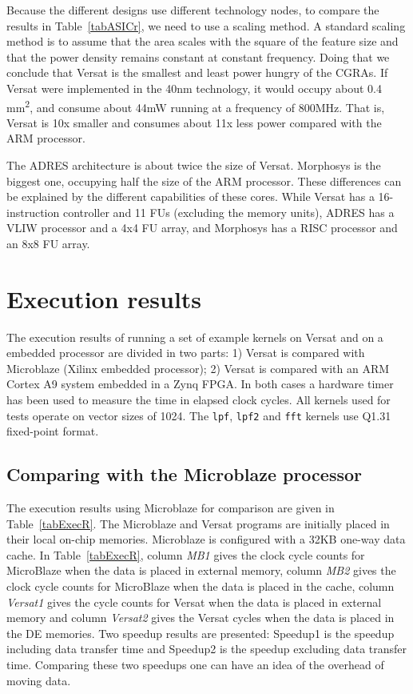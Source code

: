 Because the different designs use different technology nodes, to
compare the results in Table~\ref{tabASICr}, we need to use a scaling
method. A standard scaling method is to assume that the area scales
with the square of the feature size and that the power density remains
constant at constant frequency. Doing that we conclude that Versat is
the smallest and least power hungry of the CGRAs. If Versat were
implemented in the 40nm technology, it would occupy about 0.4
mm\textsuperscript{2}, and consume about 44mW running at a frequency
of 800MHz. That is, Versat is 10x smaller and consumes about 11x less
power compared with the ARM processor.

The ADRES architecture is about twice the size of Versat. Morphosys is
the biggest one, occupying half the size of the ARM processor. These
differences can be explained by the different capabilities of these
cores. While Versat has a 16-instruction controller and 11 FUs
(excluding the memory units), ADRES has a VLIW processor and a 4x4 FU
array, and Morphosys has a RISC processor and an 8x8 FU array.


\section{Execution results}
\label{subsection:executionResults}

The execution results of running a set of example kernels on Versat
and on a embedded processor are divided in two parts: 1) Versat is
compared with Microblaze (Xilinx embedded processor); 2) Versat is
compared with an ARM Cortex A9 system embedded in a Zynq FPGA. In both
cases a hardware timer has been used to measure the time in elapsed
clock cycles. All kernels used for tests operate on vector sizes of 1024.
The {\tt lpf}, {\tt lpf2} and {\tt fft} kernels use Q1.31 fixed-point format.

\subsection{Comparing with the Microblaze processor}

The execution results using Microblaze for comparison are given in
Table~\ref{tabExecR}. The Microblaze and Versat programs are initially
placed in their local on-chip memories. Microblaze is configured with
a 32KB one-way data cache. In Table~\ref{tabExecR}, column {\it MB1}
gives the clock cycle counts for MicroBlaze when the data is placed in
external memory, column {\it MB2} gives the clock cycle counts for
MicroBlaze when the data is placed in the cache, column {\it Versat1}
gives the cycle counts for Versat when the data is placed in external
memory and column {\it Versat2} gives the Versat cycles when the data
is placed in the DE memories. Two speedup results are presented:
Speedup1 is the speedup including data transfer time and Speedup2 is
the speedup excluding data transfer time. Comparing these two speedups
one can have an idea of the overhead of moving data.


